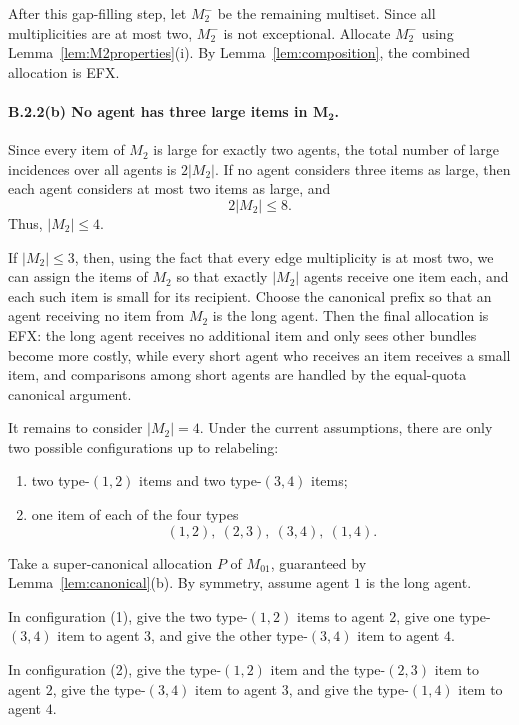 \documentclass{article}
\theoremstyle{definition}
\begin{document}
After this gap-filling step, let $M_2^-$ be the remaining multiset.  
Since all multiplicities are at most two, $M_2^-$ is not exceptional.  
Allocate $M_2^-$ using Lemma~\ref{lem:M2properties}(i).  
By Lemma~\ref{lem:composition}, the combined allocation is EFX.

\paragraph{B.2.2(b) No agent has three large items in $\boldsymbol{M_2}$.}
Since every item of $M_2$ is large for exactly two agents, the total number of
large incidences over all agents is $2|M_2|$.  If no agent considers three
items as large, then each agent considers at most two items as large, and
\[
    2|M_2|\le 8.
\]
Thus, $|M_2|\le 4$.

If $|M_2|\le 3$, then, using the fact that every edge multiplicity is at most
two, we can assign the items of $M_2$ so that exactly $|M_2|$ agents receive
one item each, and each such item is small for its recipient.  Choose the
canonical prefix so that an agent receiving no item from $M_2$ is the long
agent.  Then the final allocation is EFX: the long agent receives no
additional item and only sees other bundles become more costly, while every
short agent who receives an item receives a small item, and comparisons among
short agents are handled by the equal-quota canonical argument.

It remains to consider $|M_2|=4$.  Under the current assumptions, there are
only two possible configurations up to relabeling:
\begin{enumerate}[label=(\arabic*)]
    \item two type-$(1,2)$ items and two type-$(3,4)$ items;
    \item one item of each of the four types
    \[
        (1,2),\ (2,3),\ (3,4),\ (1,4).
    \]
\end{enumerate}

Take a super-canonical allocation $P$ of $M_{01}$, guaranteed by
Lemma~\ref{lem:canonical}(b).  By symmetry, assume agent $1$ is the long
agent.

In configuration (1), give the two type-$(1,2)$ items to agent $2$, give one
type-$(3,4)$ item to agent $3$, and give the other type-$(3,4)$ item to agent
$4$.

In configuration (2), give the type-$(1,2)$ item and the type-$(2,3)$ item to
agent $2$, give the type-$(3,4)$ item to agent $3$, and give the type-$(1,4)$
item to agent $4$.
\end{document}
